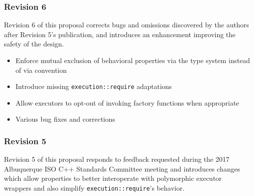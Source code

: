 \documentclass[a4paper,12pt,notitlepage,twoside,openright]{article}
\begin{document}
\hypertarget{revision-6}{%
\subsubsection{Revision 6}\label{revision-6}}

Revision 6 of this proposal corrects bugs and omissions discovered by
the authors after Revision 5's publication, and introduces an
enhancement improving the safety of the design.

\begin{itemize}

\item
  Enforce mutual exclusion of behavioral properties via the type system
  instead of via convention
\item
  Introduce missing \texttt{execution::require} adaptations
\item
  Allow executors to opt-out of invoking factory functions when
  appropriate
\item
  Various bug fixes and corrections
\end{itemize}

\hypertarget{revision-5}{%
\subsubsection{Revision 5}\label{revision-5}}

Revision 5 of this proposal responds to feedback requested during the
2017 Albuquerque ISO C++ Standards Committee meeting and introduces
changes which allow properties to better interoperate with polymorphic
executor wrappers and also simplify
\texttt{execution::require}'s behavior.
\end{document}
